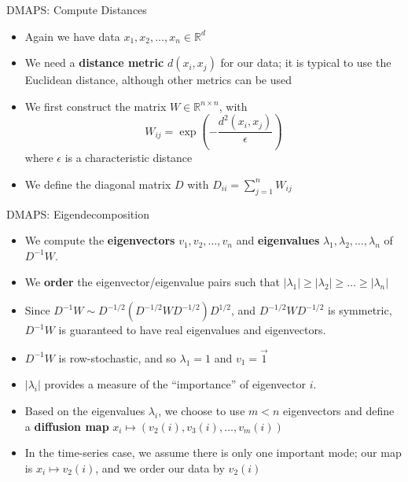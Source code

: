 \documentclass{beamer}
\begin{document}
\begin{frame}{DMAPS: Compute Distances}
\begin{itemize}
    \item Again we have data $x_1, x_2, \dots, x_n \in \mathbb{R}^d$

    \item We need a {\bf distance metric} $d(x_i, x_j)$ for our data; it is typical to use the Euclidean distance, although other metrics can be used
    \item We first construct the matrix $W \in \mathbb{R}^{n \times n}$, with
    $$W_{ij} = \exp \left( -\frac{d^2 (x_i, x_j)}{\epsilon} \right) $$
    where $\epsilon$ is a characteristic distance

    \item We define the diagonal matrix $D$ with $D_{ii} = \sum_{j=1}^{n} W_{ij}$
\end{itemize}
\end{frame}

\begin{frame}{DMAPS: Eigendecomposition}
\begin{itemize}
    \item We compute the {\bf eigenvectors} $v_1, v_2, \dots, v_n$ and {\bf eigenvalues} $\lambda_1, \lambda_2, \dots, \lambda_n$ of $D^{-1} W$.

    \item We {\bf order} the eigenvector/eigenvalue pairs such that $|\lambda_1| \ge |\lambda_2| \ge \dots \ge |\lambda_n|$

    \item Since $D^{-1}W \sim D^{-1/2} \left( D^{-1/2} W D^{-1/2} \right) D^{1/2}$, and $D^{-1/2} W D^{-1/2}$ is symmetric, $D^{-1}W$ is guaranteed to have real eigenvalues and eigenvectors.

    \item $D^{-1}W$ is row-stochastic, and so $\lambda_1 = 1$ and $v_1 =  \vec{1}$

    \item $|\lambda_i|$ provides a measure of the ``importance'' of eigenvector $i$.

    \item Based on the eigenvalues $\lambda_i$, we choose to use $m < n$ eigenvectors and define a {\bf diffusion map} $x_i \mapsto \left( v_2(i), v_3(i), \dots, v_m(i) \right)$

    \item In the time-series case, we assume there is only one important mode; our map is $x_i \mapsto v_2(i)$, and we order our data by $v_2(i)$

\end{itemize}
\end{frame}
\end{document}
